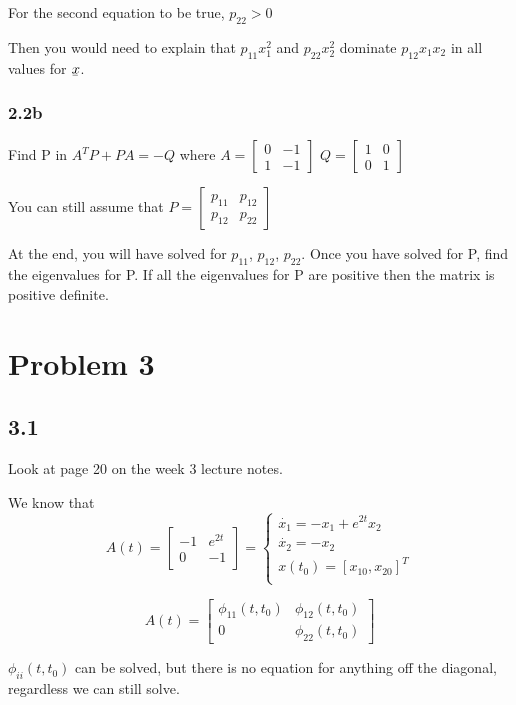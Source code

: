 \documentclass[12pt]{article}
\newcommand{\ubar}[1]{\underaccent{\bar}{#1}}
\begin{document}
For the second equation to be true, $p_{22}>0$ 

Then you would need to explain that $p_{11}x_{1}^2$ and $p_{22}x_{2}^2$ dominate $p_{12}x_1x_2$ in all values for $\ubar{x}$. 

\subsubsection*{2.2b}
Find P in $A^TP+PA=-Q$ where 
$A=\begin{bmatrix} 0 & -1 \\
1 & -1
\end{bmatrix}$
$Q=\begin{bmatrix} 1 & 0 \\
0 & 1
\end{bmatrix}$

You can still assume that $P=\begin{bmatrix} p_{11} & p_{12} \\
p_{12} & p_{22}
\end{bmatrix}$

At the end, you will have solved for $p_{11}$, $p_{12}$, $p_{22}$. Once you have solved for P, find the eigenvalues for P. If all the eigenvalues for P are positive then the matrix is positive definite. 

\section*{Problem 3}
\subsection*{3.1}
Look at page 20 on the week 3 lecture notes. 

We know that
$$A(t)=\begin{bmatrix} -1 & e^{2t} \\
0 & -1
\end{bmatrix}=\begin{cases}\dot{x_1}=-x_1+e^{2t}x_2\\ 
\dot{x_2}=-x_2\\ 
x(t_0)=[x_{10}, x_{20}]^T\\
\end{cases}$$ 

$$A(t)=\begin{bmatrix} \phi_{11}(t,t_0) & \phi_{12}(t,t_0) \\
0 & \phi_{22}(t,t_0)
\end{bmatrix}$$

$\phi_{ii}(t,t_0)$ can be solved, but there is no equation for anything off the diagonal, regardless we can still solve.
\end{document}
